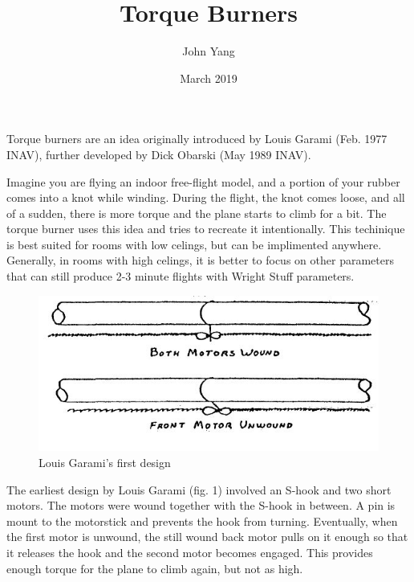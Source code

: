 \documentclass[12pt]{article}
\author{John Yang}
\date{March 2019}
\title{Torque Burners}
\begin{document}
\maketitle

Torque burners are an idea originally introduced by Louis Garami (Feb. 1977 INAV), further developed by Dick Obarski (May 1989 INAV). 

Imagine you are flying an indoor free-flight model, and a portion of your rubber comes into a knot while winding. During the flight, the knot comes loose, and all of a sudden, there is more torque and the plane starts to climb for a bit. The torque burner uses this idea and tries to recreate it intentionally. This techinique is best suited for rooms with low celings, but can be implimented anywhere. Generally, in rooms with high celings, it is better to focus on other parameters that can still produce 2-3 minute flights with Wright Stuff parameters. 
\begin{figure}[h]
\caption{Louis Garami's first design}
\centering
\includegraphics[scale=0.65]{"principle"}
\end{figure}

The earliest design by Louis Garami (fig. 1) involved an S-hook and two short motors. The motors were wound together with the S-hook in between. A pin is mount to the motorstick and prevents the hook from turning. Eventually, when the first motor is unwound, the still wound back motor pulls on it enough so that it releases the hook and the second motor becomes engaged. This provides enough torque for the plane to climb again, but not as high. 
\end{document}
